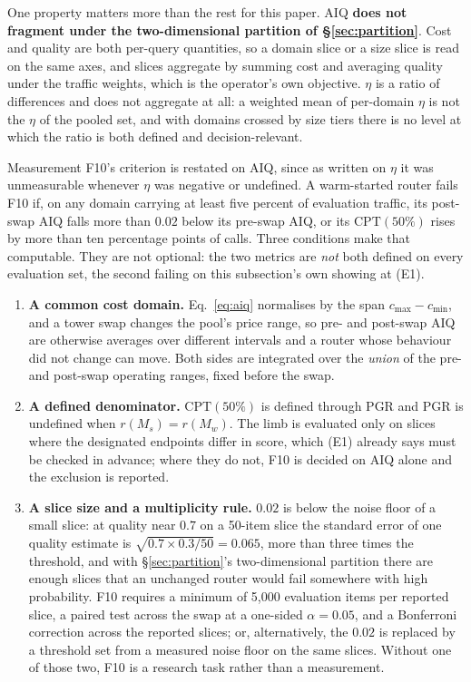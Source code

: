 \documentclass[11pt]{article}
\begin{document}
One property matters more than the rest for this paper. AIQ \textbf{does not fragment under the two-dimensional partition of \S\ref{sec:partition}}. Cost and quality are both per-query quantities, so a domain slice or a size slice is read on the same axes, and slices aggregate by summing cost and averaging quality under the traffic weights, which is the operator's own objective. $\eta$ is a ratio of differences and does not aggregate at all: a weighted mean of per-domain $\eta$ is not the $\eta$ of the pooled set, and with domains crossed by size tiers there is no level at which the ratio is both defined and decision-relevant.

Measurement F10's criterion is restated on AIQ, since as written on $\eta$ it was unmeasurable whenever $\eta$ was negative or undefined. A warm-started router fails F10 if, on any domain carrying at least five percent of evaluation traffic, its post-swap AIQ falls more than $0.02$ below its pre-swap AIQ, or its $\mathrm{CPT}(50\%)$ rises by more than ten percentage points of calls. Three conditions make that computable. They are not optional: the two metrics are \emph{not} both defined on every evaluation set, the second failing on this subsection's own showing at (E1).

\begin{enumerate}[label=(\roman*),itemsep=2pt]
\item \textbf{A common cost domain.} Eq.~\eqref{eq:aiq} normalises by the span $c_{\max}-c_{\min}$, and a tower swap changes the pool's price range, so pre- and post-swap AIQ are otherwise averages over different intervals and a router whose behaviour did not change can move. Both sides are integrated over the \emph{union} of the pre- and post-swap operating ranges, fixed before the swap.
\item \textbf{A defined denominator.} $\mathrm{CPT}(50\%)$ is defined through PGR and PGR is undefined when $r(M_s) = r(M_w)$. The limb is evaluated only on slices where the designated endpoints differ in score, which (E1) already says must be checked in advance; where they do not, F10 is decided on AIQ alone and the exclusion is reported.
\item \textbf{A slice size and a multiplicity rule.} $0.02$ is below the noise floor of a small slice: at quality near $0.7$ on a 50-item slice the standard error of one quality estimate is $\sqrt{0.7\times0.3/50} = 0.065$, more than three times the threshold, and with \S\ref{sec:partition}'s two-dimensional partition there are enough slices that an unchanged router would fail somewhere with high probability. F10 requires a minimum of 5{,}000 evaluation items per reported slice, a paired test across the swap at a one-sided $\alpha = 0.05$, and a Bonferroni correction across the reported slices; or, alternatively, the $0.02$ is replaced by a threshold set from a measured noise floor on the same slices. Without one of those two, F10 is a research task rather than a measurement.
\end{enumerate}
\end{document}
